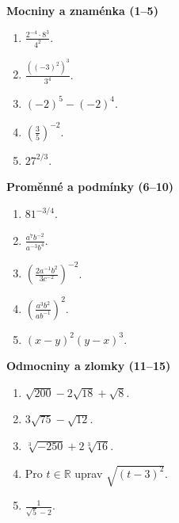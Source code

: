 \documentclass[11pt,a4paper]{article}
\begin{document}

\begin{zadaniReseniBox}[title={Domácí úkol}]
\textbf{Mocniny a znaménka (1--5)}\par
\begin{enumerate}[label=\arabic*)]
\item $\displaystyle\frac{2^{-4}\cdot8^3}{4^2}$.
\item $\displaystyle\frac{((-3)^2)^3}{3^4}$.
\item $(-2)^5-(-2)^4$.
\item $\displaystyle\left(\frac35\right)^{-2}$.
\item $27^{2/3}$.
\end{enumerate}

\textbf{Proměnné a podmínky (6--10)}\par
\begin{enumerate}[label=\arabic*),start=6]
\item $81^{-3/4}$.
\item $\displaystyle\frac{a^7b^{-2}}{a^{-3}b^4}$.
\item $\displaystyle\left(\frac{2a^{-1}b^2}{3c^{-2}}\right)^{-2}$.
\item $\displaystyle\left(\frac{a^3b^2}{ab^{-1}}\right)^2$.
\item $(x-y)^2(y-x)^3$.
\end{enumerate}

\textbf{Odmocniny a zlomky (11--15)}\par
\begin{enumerate}[label=\arabic*),start=11]
\item $\sqrt{200}-2\sqrt{18}+\sqrt8$.
\item $3\sqrt{75}-\sqrt{12}$.
\item $\sqrt[3]{-250}+2\sqrt[3]{16}$.
\item Pro $t\in\mathbb R$ uprav $\sqrt{(t-3)^2}$.
\item $\displaystyle\frac1{\sqrt5-2}$.
\end{enumerate}


\end{zadaniReseniBox}
\end{document}
